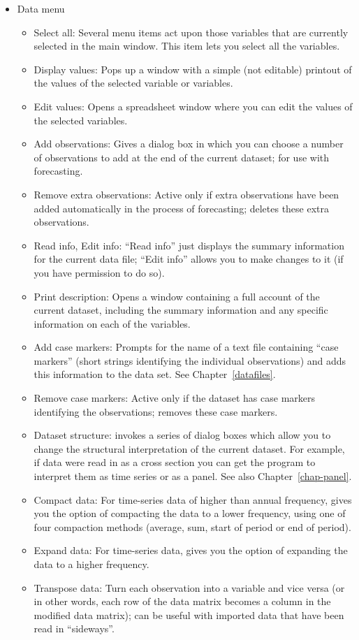 \begin{itemize}
\item \textsf{Data menu}
  \begin{itemize}
  \item \textsf{Select all}: Several menu items act upon those
    variables that are currently selected in the main window.  This
    item lets you select all the variables.
  \item \textsf{Display values}: Pops up a window with a simple (not
    editable) printout of the values of the selected variable or
    variables.
  \item \textsf{Edit values}: Opens a spreadsheet window where you
    can edit the values of the selected variables. 
  \item \textsf{Add observations}: Gives a dialog box in which you can
    choose a number of observations to add at the end of the current
    dataset; for use with forecasting.
  \item \textsf{Remove extra observations}: Active only if extra
    observations have been added automatically in the process of
    forecasting; deletes these extra observations.
  \item \textsf{Read info}, \textsf{Edit info}: ``Read info'' just
    displays the summary information for the current data file; ``Edit
    info'' allows you to make changes to it (if you have permission to
    do so).
  \item \textsf{Print description}: Opens a window containing a full
    account of the current dataset, including the summary information
    and any specific information on each of the variables.
  \item \textsf{Add case markers}: Prompts for the name of a text file
    containing ``case markers'' (short strings identifying the
    individual observations) and adds this information to the data
    set. See Chapter~\ref{datafiles}.
  \item \textsf{Remove case markers}: Active only if the dataset has
    case markers identifying the observations; removes these case
    markers.
  \item \textsf{Dataset structure}: invokes a series of dialog boxes
    which allow you to change the structural interpretation of the
    current dataset.  For example, if data were read in as a cross
    section you can get the program to interpret them as time series
    or as a panel.  See also Chapter~\ref{chap-panel}.
  \item \textsf{Compact data}: For time-series data of higher than
    annual frequency, gives you the option of compacting the data to a
    lower frequency, using one of four compaction methods (average,
    sum, start of period or end of period).
  \item \textsf{Expand data}: For time-series data, gives you the
    option of expanding the data to a higher frequency.
  \item \textsf{Transpose data}: Turn each observation into a variable
    and vice versa (or in other words, each row of the data matrix
    becomes a column in the modified data matrix); can be useful with
    imported data that have been read in ``sideways''.
  \end{itemize}


\end{itemize}
